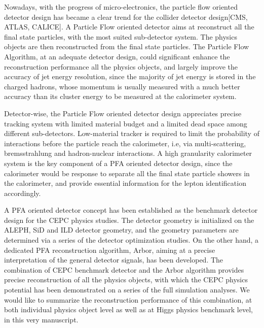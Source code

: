 Nowadays, with the progress of micro-electronics,
the particle flow oriented detector design has became a clear trend for the collider detector design[CMS, ATLAS, CALICE].
A Particle Flow oriented detector aims at reconstruct all the final state particles, with the most suited sub-detector system.
The physics objects are then reconstructed from the final state particles.
The Particle Flow Algorithm, at an adequate detector design,
could significant enhance the reconstruction performance all the physics objects,
and largely improve the accuracy of jet energy resolution, since the majority of jet energy is stored in the charged hadrons,
whose momentum is usually measured with a much better accuracy than its cluster energy to be measured at the calorimeter system. 

Detector-wise, the Particle Flow oriented detector design appreciates precise tracking system
with limited material budget and a limited dead space among different sub-detectors.
Low-material tracker is required to limit the probability of interactions before the particle reach the calorimeter,
i.e, via multi-scattering, bremsstrahlung and hadron-nuclear interactions.
A high granularity calorimeter system is the key component of a PFA oriented detector design,
since the calorimeter would be response to separate all the final state particle showers in the calorimeter,
and provide essential information for the lepton identification accordingly. 


A PFA oriented detector concept has been established as the benchmark detector design for the CEPC physics studies.
The detector geometry is initialized on the ALEPH, SiD and ILD detector geometry,
and the geometry parameters are determined via a series of the detector optimization studies.
On the other hand, a dedicated PFA reconstruction algorithm, Arbor,
aiming at a precise interpretation of the general detector signals, has been developed.
The combination of CEPC benchmark detector and the Arbor algorithm provides precise reconstruction of all the physics objects,
with which the CEPC physics potential has been demonstrated on a series of the full simulation analyses.
We would like to summarize the reconstruction performance of this combination,
at both individual physics object level as well as at Higgs physics benchmark level, in this very manuscript. 

